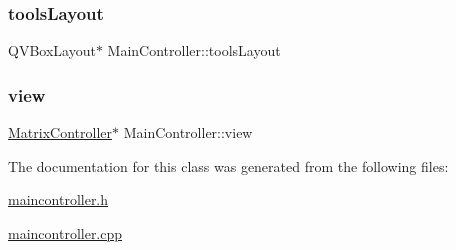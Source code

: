 \mbox{\label{class_main_controller_a20c2cdd1c4ec1dda449df88f9d491696}} 
\subsubsection{\texorpdfstring{tools\+Layout}{toolsLayout}}
{\footnotesize\ttfamily Q\+V\+Box\+Layout$\ast$ Main\+Controller\+::tools\+Layout\hspace{0.3cm}{\ttfamily [private]}}

\mbox{\label{class_main_controller_a24cdae20cbd62e663687fa079c23e83a}} 
\subsubsection{\texorpdfstring{view}{view}}
{\footnotesize\ttfamily \mbox{\hyperlink{class_matrix_controller}{Matrix\+Controller}}$\ast$ Main\+Controller\+::view\hspace{0.3cm}{\ttfamily [private]}}



The documentation for this class was generated from the following files\+:\begin{DoxyCompactItemize}
\item 
\mbox{\hyperlink{maincontroller_8h}{maincontroller.\+h}}\item 
\mbox{\hyperlink{maincontroller_8cpp}{maincontroller.\+cpp}}\end{DoxyCompactItemize}
